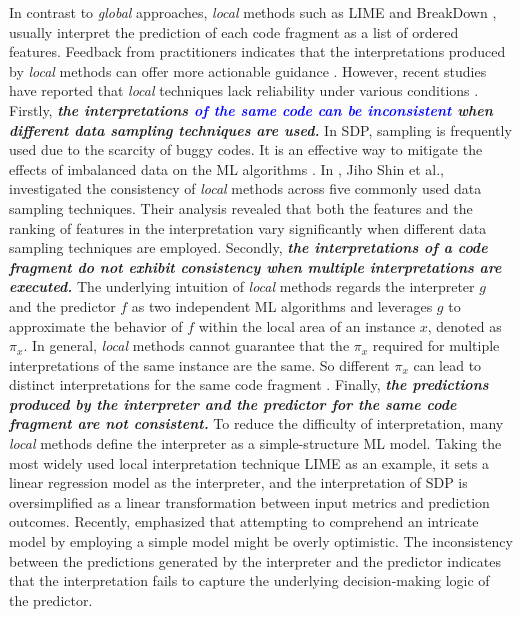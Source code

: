 In contrast to \textit{global} approaches, \textit{local} methods such as LIME \cite{lime} and BreakDown \cite{34}, usually interpret the prediction of each code fragment as a list of ordered features. Feedback from practitioners indicates that the interpretations produced by \textit{local} methods can offer more actionable guidance \cite{58}.
However, recent studies have reported that \textit{local} techniques lack reliability under various conditions \cite{36,37,58}. Firstly, \textit{\textbf{ the interpretations \textcolor{blue}{of the same code can be inconsistent} when different data sampling techniques are used.}} 
In SDP, sampling is frequently used due to the scarcity of buggy codes. It is an effective way to mitigate the effects of imbalanced data on the ML algorithms \cite{59}. In \cite{58}, Jiho Shin et al., investigated the consistency of \textit{local} methods across five commonly used data sampling techniques. Their analysis revealed that both the features and the ranking of features in the interpretation vary significantly when different data sampling techniques are employed.
Secondly, \textit{\textbf{the interpretations of a code fragment do not exhibit consistency when multiple interpretations are executed.}} The underlying intuition of \textit{local} methods regards the interpreter $g$ and the predictor $f$ as two independent ML algorithms and leverages $g$ to approximate the behavior of $f$ within the local area of an instance $x$, denoted as $\pi_x$. In general, \textit{local} methods cannot guarantee that the $\pi_x$ required for multiple interpretations of the same instance are the same. So different $\pi_x$ can lead to distinct interpretations for the same code fragment \cite{37}. Finally, \textit{\textbf{the predictions produced by the interpreter and the predictor for the same code fragment are not consistent.}} To reduce the difficulty of interpretation, many \textit{local} methods define the interpreter as a simple-structure ML model. Taking the most widely used local interpretation technique LIME as an example, it sets a linear regression model as the interpreter, and the interpretation of SDP is oversimplified as a linear transformation between input metrics and prediction outcomes.
Recently, \cite{37} emphasized that attempting to comprehend an intricate model by employing a simple model might be overly optimistic. The inconsistency between the predictions generated by the interpreter and the predictor indicates that the interpretation fails to capture the underlying decision-making logic of the predictor.

